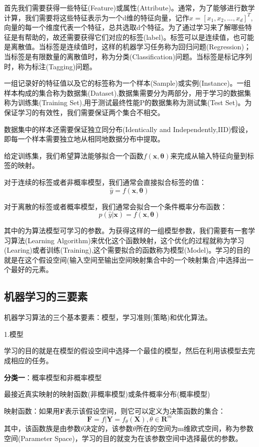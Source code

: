 \documentclass[openbib]{article}
\begin{document}
首先我们需要获得一些特征(Feature)或属性(Attribute)。通常，为了能够进行数学计算，我们需要将这些特征表示为一个d维的特征向量，记作$x=[x_1,x_2,...,x_d]^T$,向量的每一个维度代表一个特征，总共选取d个特征。为了通过学习来了解哪些特征是有帮助的，故还需要获得它们对应的标签(label)。标签可以是连续值，也可能是离散值。当标签是连续值时，这样的机器学习任务称为回归问题(Regression)；当标签是有限数量的离散值时，称为分类(Classification)问题。当标签是标记序列时，称为标注(Tagging)问题。

一组记录好的特征值以及它的标签称为一个样本(Sample)或实例(Instance)。一组样本构成的集合称为数据集(Dataset),数据集需要分为两部分，用于学习的数据集称为训练集(Training Set),用于测试最终性能P的数据集称为测试集(Test Set)。为保证学习的有效性，我们需要保证两个集合不相交。

数据集中的样本还需要保证独立同分布(Identically and Independently,IID)假设，即每一个样本需要独立地从相同地数据分布中提取。

给定训练集，我们希望算法能够拟合一个函数$f(\textbf{x},\bm{\theta})$来完成从输入特征向量到标签的映射。

对于连续的标签或者非概率模型，我们通常会直接拟合标签的值：$$\hat{y}=f(\textbf{x},\bm{\theta})$$

对于离散的标签或者概率模型，我们通常会拟合一个条件概率分布函数：$$p(\hat{y}|\textbf{x})=f(\textbf{x},\bm{\theta})$$

其中的\bm{$\theta$}为算法模型可学习的参数。为获得这样的一组模型参数\bm{$\theta$}，我们需要有一套学习算法(Learning Algorithm)来优化这个函数映射，这个优化的过程就称为学习(Learing)或者训练(Training),这个需要拟合的函数称为模型(Model)。学习的目的就是在这个假设空间(输入空间至输出空间映射集合中的一个映射集合)中选择出一个最好的元素。

\subsection{机器学习的三要素}
机器学习算法的三个基本要素：模型，学习准则(策略)和优化算法。

1.模型

学习的目的就是在模型的假设空间中选择一个最佳的模型，然后在利用该模型去完成相应的任务。

\textbf{分类一}：概率模型和非概率模型

最接近真实映射的映射函数(非概率模型)或条件概率分布(概率模型)

映射函数：如果用\textbf{F}表示该假设空间，则它可以定义为决策函数的集合：
$$\textbf{F}={f|\textbf{Y}=f_{\theta}(\textbf{X}),\theta \in \textbf{R}^m}$$
其中，该函数族是由参数$\theta$决定的，该参数$\theta$所在的空间为m维欧式空间，称为参数空间(Parameter Space)，学习的目的就变为在该参数空间中选择最优的参数。
\end{document}

